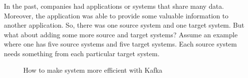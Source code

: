 In the past, companies had applications or systems that share many data. Moreover, the application was able to provide some valuable information to another application. So, there was one source system and one target system. But what about adding some more source and target systems? Assume an example where one has five source systems and five target systems. Each source system needs something from each particular target system. 
\begin{figure}[ht!]
    \hspace{0.01\textwidth}
    \hspace{0.01\textwidth}
    \hspace{0.01\textwidth}
    \caption{How to make system more efficient with Kafka}
    \label{fig:withoutAndWithBroker}
\end{figure}

